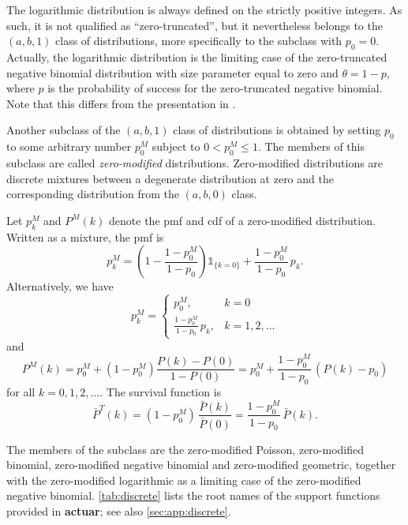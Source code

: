 \documentclass[x11names]{article}
\newcommand{\pkg}[1]{\textbf{#1}}
\begin{document}
The logarithmic distribution is always defined on the strictly
positive integers. As such, it is not qualified as ``zero-truncated'',
but it nevertheless belongs to the $(a, b, 1)$ class of distributions,
more specifically to the subclass with $p_0 = 0$. Actually, the
logarithmic distribution is the limiting case of the zero-truncated
negative binomial distribution with size parameter equal to zero and
$\theta = 1 - p$, where $p$ is the probability of success for the
zero-truncated negative binomial. Note that this differs from the
presentation in \citet{LossModels4e}.

Another subclass of the $(a, b, 1)$ class of distributions is obtained
by setting $p_0$ to some arbitrary number $p_0^M$ subject to
$0 < p_0^M \leq 1$. The members of this subclass are called
\emph{zero-modified} distributions. Zero-modified distributions are
discrete mixtures between a degenerate distribution at zero and the
corresponding distribution from the $(a, b, 0)$ class.

Let $p_k^M$ and $P^M(k)$ denote the pmf and cdf of a zero-modified
distribution. Written as a mixture, the pmf is
\begin{equation}
  \label{eq:mixture}
  p_k^M = \left(1 - \frac{1 - p_0^M}{1 - p_0} \right) \mathbb{1}_{\{k = 0\}}
  + \frac{1 - p_0^M}{1 - p_0}\, p_k.
\end{equation}
Alternatively, we have
\begin{equation*}
  p_k^M =
  \begin{cases}
    p_0^M, & k = 0 \\
    \displaystyle\frac{1 - p_0^M}{1 - p_0}\, p_k, & k = 1, 2, \dots
  \end{cases}
\end{equation*}
and
\begin{equation*}
  P^M(k)
  = p_0^M + (1 - p_0^M) \frac{P(k) - P(0)}{1 - P(0)}
  = p_0^M + \frac{1 - p_0^M}{1 - p_0}\, (P(k) - p_0)
\end{equation*}
for all $k = 0, 1, 2, \dots$. The survival function is
\begin{equation*}
  \bar{P}^T(k)
  = (1 - p_0^M)\, \frac{\bar{P}(k)}{\bar{P}(0)}
  = \frac{1 - p_0^M}{1 - p_0}\, \bar{P}(k).
\end{equation*}

The members of the subclass are the zero-modified Poisson,
zero-modified binomial, zero-modified negative binomial and
zero-modified geometric, together with the zero-modified logarithmic
as a limiting case of the zero-modified negative binomial.
\autoref{tab:discrete} lists the root names of the support functions
provided in \pkg{actuar}; see also \autoref{sec:app:discrete}.
\end{document}
